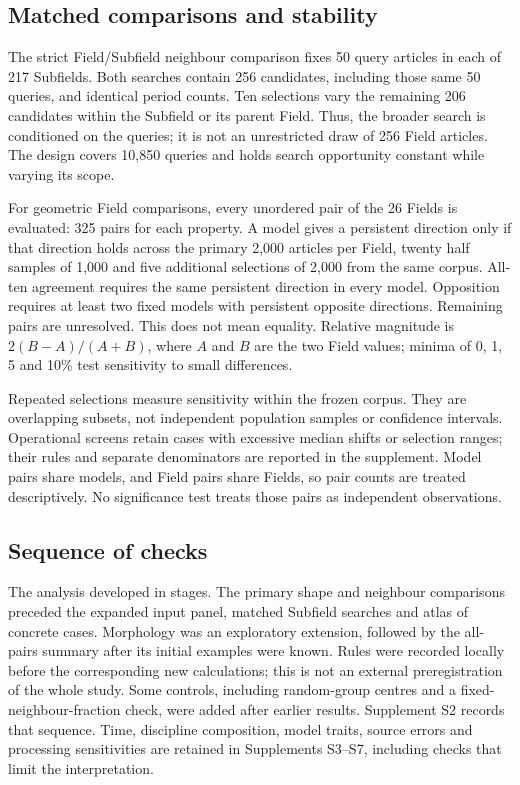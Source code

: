 \documentclass[12pt]{article}
\begin{document}
\subsection{Matched comparisons and stability}
The strict Field/Subfield neighbour comparison fixes 50 query articles in each of 217 Subfields. Both searches contain 256 candidates, including those same 50 queries, and identical period counts. Ten selections vary the remaining 206 candidates within the Subfield or its parent Field. Thus, the broader search is conditioned on the queries; it is not an unrestricted draw of 256 Field articles. The design covers 10,850 queries and holds search opportunity constant while varying its scope.

For geometric Field comparisons, every unordered pair of the 26 Fields is evaluated: 325 pairs for each property. A model gives a persistent direction only if that direction holds across the primary 2,000 articles per Field, twenty half samples of 1,000 and five additional selections of 2,000 from the same corpus. All-ten agreement requires the same persistent direction in every model. Opposition requires at least two fixed models with persistent opposite directions. Remaining pairs are unresolved. This does not mean equality. Relative magnitude is $2(B-A)/(A+B)$, where $A$ and $B$ are the two Field values; minima of 0, 1, 5 and 10\% test sensitivity to small differences.

Repeated selections measure sensitivity within the frozen corpus. They are overlapping subsets, not independent population samples or confidence intervals. Operational screens retain cases with excessive median shifts or selection ranges; their rules and separate denominators are reported in the supplement. Model pairs share models, and Field pairs share Fields, so pair counts are treated descriptively. No significance test treats those pairs as independent observations.

\subsection{Sequence of checks}
The analysis developed in stages. The primary shape and neighbour comparisons preceded the expanded input panel, matched Subfield searches and atlas of concrete cases. Morphology was an exploratory extension, followed by the all-pairs summary after its initial examples were known. Rules were recorded locally before the corresponding new calculations; this is not an external preregistration of the whole study. Some controls, including random-group centres and a fixed-neighbour-fraction check, were added after earlier results. Supplement S2 records that sequence. Time, discipline composition, model traits, source errors and processing sensitivities are retained in Supplements S3--S7, including checks that limit the interpretation.
\end{document}
